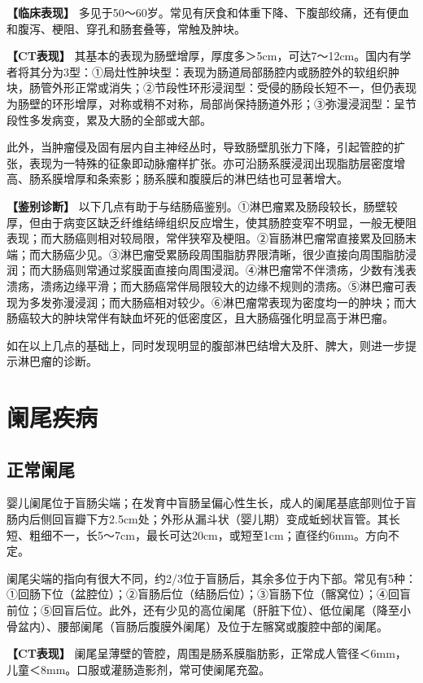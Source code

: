 \textbf{【临床表现】}
多见于50～60岁。常见有厌食和体重下降、下腹部绞痛，还有便血和腹泻、梗阻、穿孔和肠套叠等，常触及肿块。

\textbf{【CT表现】}
其基本的表现为肠壁增厚，厚度多＞5cm，可达7～12cm。国内有学者将其分为3型：①局灶性肿块型：表现为肠道局部肠腔内或肠腔外的软组织肿块，肠管外形正常或消失；②节段性环形浸润型：受侵的肠段长短不一，但仍表现为肠壁的环形增厚，对称或稍不对称，局部尚保持肠道外形；③弥漫浸润型：呈节段性多发病变，累及大肠的全部或大部。

此外，当肿瘤侵及固有层内自主神经丛时，导致肠壁肌张力下降，引起管腔的扩张，表现为一特殊的征象即动脉瘤样扩张。亦可沿肠系膜浸润出现脂肪层密度增高、肠系膜增厚和条索影；肠系膜和腹膜后的淋巴结也可显著增大。

\textbf{【鉴别诊断】}
以下几点有助于与结肠癌鉴别。①淋巴瘤累及肠段较长，肠壁较厚，但由于病变区缺乏纤维结缔组织反应增生，使其肠腔变窄不明显，一般无梗阻表现；而大肠癌则相对较局限，常伴狭窄及梗阻。②盲肠淋巴瘤常直接累及回肠末端；而大肠癌少见。③淋巴瘤受累肠段周围脂肪界限清晰，很少直接向周围脂肪浸润；而大肠癌则常通过浆膜面直接向周围浸润。④淋巴瘤常不伴溃疡，少数有浅表溃疡，溃疡边缘平滑；而大肠癌常伴局限较大的边缘不规则的溃疡。⑤淋巴瘤可表现为多发弥漫浸润；而大肠癌相对较少。⑥淋巴瘤常表现为密度均一的肿块；而大肠癌较大的肿块常伴有缺血坏死的低密度区，且大肠癌强化明显高于淋巴瘤。

如在以上几点的基础上，同时发现明显的腹部淋巴结增大及肝、脾大，则进一步提示淋巴瘤的诊断。

\section{阑尾疾病}

\subsection{正常阑尾}

婴儿阑尾位于盲肠尖端；在发育中盲肠呈偏心性生长，成人的阑尾基底部则位于盲肠内后侧回盲瓣下方2.5cm处；外形从漏斗状（婴儿期）变成蚯蚓状盲管。其长短、粗细不一，长5～7cm，最长可达20cm，或短至1cm；直径约6mm。方向不定。

阑尾尖端的指向有很大不同，约2/3位于盲肠后，其余多位于内下部。常见有5种：①回肠下位（盆腔位）；②盲肠后位（结肠后位）；③盲肠下位（髂窝位）；④回盲前位；⑤回盲后位。此外，还有少见的高位阑尾（肝脏下位）、低位阑尾（降至小骨盆内）、腰部阑尾（盲肠后腹膜外阑尾）及位于左髂窝或腹腔中部的阑尾。

\textbf{【CT表现】}
阑尾呈薄壁的管腔，周围是肠系膜脂肪影，正常成人管径＜6mm，儿童＜8mm。口服或灌肠造影剂，常可使阑尾充盈。

